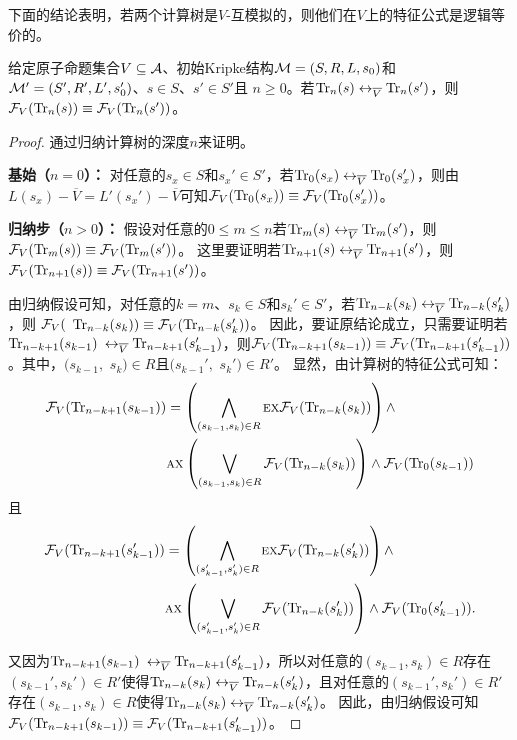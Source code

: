 下面的结论表明，若两个计算树是$V$-互模拟的，则他们在$V$上的特征公式是逻辑等价的。
\begin{lemma}\label{lem:Vb:TrFormula:Equ}
	给定原子命题集合$V\subseteq {\cal A}$、初始Kripke结构${\cal M}=(S,R,L,s_0)$和${\cal M}'=(S',R',L',s_0')$、$s\in S$、$s'\in S'$且 $n\ge 0$。若$\textrm{Tr}_n(s) \leftrightarrow_{\overline V} \textrm{Tr}_n(s')$，则${\cal F}_V(\textrm{Tr}_n(s)) \equiv {\cal F}_V(\textrm{Tr}_n(s'))$。
\end{lemma}
\begin{proof}
	通过归纳计算树的深度$n$来证明。
	
	\textbf{基始（$n=0$）：} 对任意的$s_x\in S$和$s_x' \in S'$，若$\textrm{Tr}_0(s_x) \leftrightarrow_{\overline V} \textrm{Tr}_0(s_x')$，则由$L(s_x) - \overline V = L'(s_x') - \overline V$可知${\cal F}_V(\textrm{Tr}_0(s_x)) \equiv {\cal F}_V(\textrm{Tr}_0(s_x'))$。
	
	\textbf{归纳步（$n>0$）：} 假设对任意的$0\leq m \leq n$若$\textrm{Tr}_m(s) \leftrightarrow_{\overline V} \textrm{Tr}_m(s')$，则${\cal F}_V(\textrm{Tr}_m(s)) \equiv {\cal F}_V(\textrm{Tr}_m(s'))$。
	这里要证明若$\textrm{Tr}_{n+1}(s) \leftrightarrow_{\overline V} \textrm{Tr}_{n+1}(s')$，则${\cal F}_V(\textrm{Tr}_{n+1}(s)) \equiv {\cal F}_V(\textrm{Tr}_{n+1}(s'))$。
	
	由归纳假设可知，对任意的$k=m$、$s_k\in S$和$s_k'\in S'$，若$\textrm{Tr}_{n-k}(s_k) \leftrightarrow_{\overline V} \textrm{Tr}_{n-k}(s_k')$，则 ${\cal F}_V($ $\textrm{Tr}_{n-k}(s_k)) \equiv {\cal F}_V(\textrm{Tr}_{n-k}(s_k'))$。
	因此，要证原结论成立，只需要证明若$\textrm{Tr}_{n-k+1}(s_{k-1})$ $\leftrightarrow_{\overline V} \textrm{Tr}_{n-k+1}(s_{k-1}')$，则${\cal F}_V(\textrm{Tr}_{n-k+1}(s_{k-1})) \equiv {\cal F}_V(\textrm{Tr}_{n-k+1}(s_{k-1}'))$。其中，$(s_{k-1},$ $s_k)\in R$且$(s_{k-1}',$ $s_k')\in R'$。
	显然，由计算树的特征公式可知：
	\begin{align*}
		{\cal F}_V(\textrm{Tr}_{n-k+1}(s_{k-1})) &  =
		\left(\bigwedge_{(s_{k-1},s_k)\in R}
		\textsc{e} \textsc{x} {\cal F}_V(\textrm{Tr}_{n-k}(s_k))\right)
		\wedge \\
		&\textsc{a} \textsc{x}\left(\bigvee_{(s_{k-1},s_k)\in R}
		{\cal F}_V(\textrm{Tr}_{n-k}(s_k) )\right)
		\wedge {\cal F}_V(\textrm{Tr}_0(s_{k-1}))
	\end{align*}
	且
	\begin{align*}
		{\cal F}_V(\textrm{Tr}_{n-k+1}(s_{k-1}')) &  =
		\left(\bigwedge_{(s_{k-1}',s_k')\in R}
		\textsc{e} \textsc{x} {\cal F}_V(\textrm{Tr}_{n-k}(s_k'))\right)
		\wedge \\
		&\textsc{a} \textsc{x}\left(\bigvee_{(s_{k-1}',s_k')\in R}
		{\cal F}_V(\textrm{Tr}_{n-k}(s_k') )\right)
		\wedge {\cal F}_V(\textrm{Tr}_0(s_{k-1}')).
	\end{align*} 
	
	又因为$\textrm{Tr}_{n-k+1}(s_{k-1})$ $\leftrightarrow_{\overline V} \textrm{Tr}_{n-k+1}(s_{k-1}')$，所以对任意的$(s_{k-1}, s_k) \in R$存在$(s_{k-1}', s_k') \in R'$使得$\textrm{Tr}_{n-k}(s_k) \leftrightarrow_{\overline V} \textrm{Tr}_{n-k}(s_k')$，且对任意的$(s_{k-1}', s_k') \in R'$存在$(s_{k-1}, s_k) \in R$使得$\textrm{Tr}_{n-k}(s_k) \leftrightarrow_{\overline V} \textrm{Tr}_{n-k}(s_k')$。
	因此，由归纳假设可知${\cal F}_V(\textrm{Tr}_{n-k+1}(s_{k-1})) \equiv {\cal F}_V(\textrm{Tr}_{n-k+1}(s_{k-1}'))$。
\end{proof}

